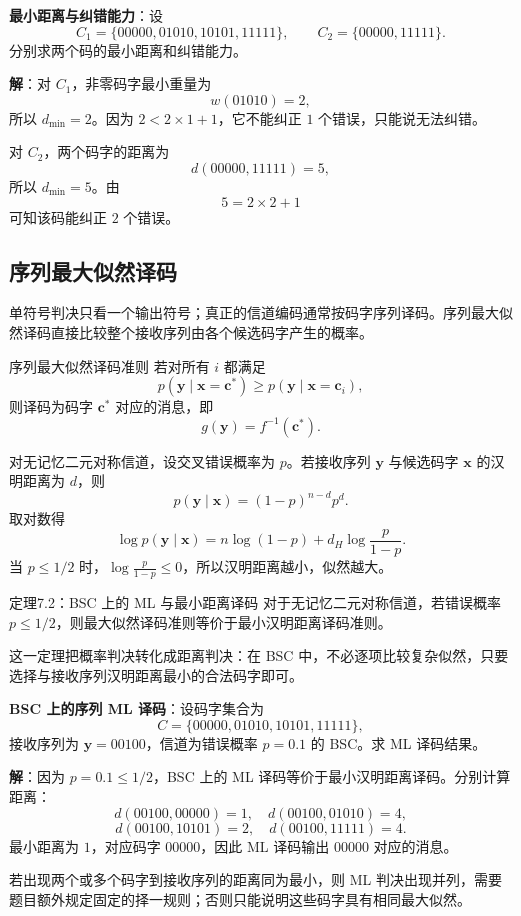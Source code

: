 \begin{example}
\label{ex:ch7-minimum-distance-correction}
\textbf{最小距离与纠错能力}：设
\[
C_1=\{00000,01010,10101,11111\},
\qquad
C_2=\{00000,11111\}.
\]
分别求两个码的最小距离和纠错能力。

\textbf{解}：对 $C_1$，非零码字最小重量为
\[
w(01010)=2,
\]
所以 $d_{\min}=2$。因为 $2<2\times1+1$，它不能纠正 $1$ 个错误，只能说无法纠错。

对 $C_2$，两个码字的距离为
\[
d(00000,11111)=5,
\]
所以 $d_{\min}=5$。由
\[
5=2\times2+1
\]
可知该码能纠正 $2$ 个错误。
\end{example}

\subsection{序列最大似然译码}

单符号判决只看一个输出符号；真正的信道编码通常按码字序列译码。序列最大似然译码直接比较整个接收序列由各个候选码字产生的概率。

\begin{definitionBox}{序列最大似然译码准则}
若对所有 $i$ 都满足
\[
p(\mathbf{y}\mid \mathbf{x}=\mathbf{c}^*)
\ge
p(\mathbf{y}\mid \mathbf{x}=\mathbf{c}_i),
\]
则译码为码字 $\mathbf{c}^*$ 对应的消息，即
\[
g(\mathbf{y})=f^{-1}(\mathbf{c}^*).
\]
\end{definitionBox}

对无记忆二元对称信道，设交叉错误概率为 $p$。若接收序列 $\mathbf{y}$ 与候选码字 $\mathbf{x}$ 的汉明距离为 $d$，则
\[
p(\mathbf{y}\mid\mathbf{x})=(1-p)^{n-d}p^d.
\]
取对数得
\[
\log p(\mathbf{y}\mid\mathbf{x})
=n\log(1-p)+d_H\log\frac{p}{1-p}.
\]
当 $p\le1/2$ 时，$\log\frac{p}{1-p}\le0$，所以汉明距离越小，似然越大。

\begin{theoremBox}{定理7.2：BSC 上的 ML 与最小距离译码}
对于无记忆二元对称信道，若错误概率 $p\le1/2$，则最大似然译码准则等价于最小汉明距离译码准则。
\end{theoremBox}

这一定理把概率判决转化成距离判决：在 BSC 中，不必逐项比较复杂似然，只要选择与接收序列汉明距离最小的合法码字即可。

\begin{example}
\label{ex:ch7-bsc-sequence-ml}
\textbf{BSC 上的序列 ML 译码}：设码字集合为
\[
C=\{00000,01010,10101,11111\},
\]
接收序列为 $\mathbf{y}=00100$，信道为错误概率 $p=0.1$ 的 BSC。求 ML 译码结果。

\textbf{解}：因为 $p=0.1\le1/2$，BSC 上的 ML 译码等价于最小汉明距离译码。分别计算距离：
\[
d(00100,00000)=1,
\quad
d(00100,01010)=4,
\]
\[
d(00100,10101)=2,
\quad
d(00100,11111)=4.
\]
最小距离为 $1$，对应码字 $00000$，因此 ML 译码输出 $00000$ 对应的消息。

若出现两个或多个码字到接收序列的距离同为最小，则 ML 判决出现并列，需要题目额外规定固定的择一规则；否则只能说明这些码字具有相同最大似然。
\end{example}

